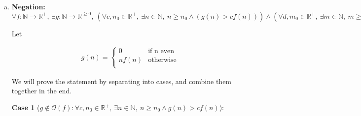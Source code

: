 \documentclass[12pt]{article}
\begin{document}
\begin{enumerate}[a.]
    \bigskip

    Then, it follows from above that $cn^2 \leq \frac{c}{3}n^4$ holds.

    \bigskip

    Then, because we know $n^4 \leq \frac{c}{3}n^4$, $165n^3 \leq \frac{c}{3}n^4$,
    and $cn^2 \leq \frac{c}{3}n^4$ are true, we can conclude that
    $n^4 + 165n^3 + cn^2 \leq cn^4$ is true.

    \bigskip

    Then,

    \begin{align}
        n^4 + 165n^3 + cn^2 &\leq cn^4\\
        n^4 + 165n^3 &\leq c(n^4 - n^2)
    \end{align}

    \bigskip

    Then, it follows from the definition of Big-Oh that the statement $n^4 + 165n^3
    \in \mathcal{O}(n^4 - n^2)$ is true.

    \item


    \textbf{Negation:} $\forall f: \mathbb{N} \to \mathbb{R}^{+},\:\exists g:\mathbb{N}
    \to \mathbb{R}^{\geq 0},\:(\forall c,n_0 \in \mathbb{R}^{+},\:\exists n \in \mathbb{N},
    \:n \geq n_0 \land (g(n) > cf(n))) \land (\forall d,m_0 \in \mathbb{R}^{+},\:\exists
    m \in \mathbb{N},\:m \geq m_0 \land (g(n) < cf(n)))$

    \bigskip

    Let

    \begin{align*}
        g(n) = \left \{
        \begin{array}{ll}
            0 & \text{if n even}\\
            nf(n) & \text{otherwise}\\
        \end{array} \right.
    \end{align*}

    \bigskip

    We will prove the statement by separating into cases, and combine them
    together in the end.

    \bigskip

    \textbf{Case 1} ($g \notin \mathcal{O}(f):\forall c,n_0 \in \mathbb{R}^{+},\:
    \exists n \in \mathbb{N},\:n \geq n_0 \land g(n) > cf(n)$):


\end{enumerate}
\end{document}
